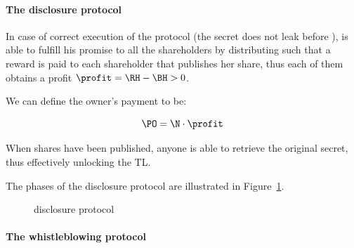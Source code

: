 \paragraph{The disclosure protocol}

In case of correct execution of the protocol (the secret does not leak before \td),  \owner is able to fulfill his promise to all the shareholders by distributing \PO such that a reward \RH is paid to each shareholder that publishes her share, thus each of them obtains a profit $\profit = \RH - \BH > 0$.

We can define the owner's payment to be:

\begin{equation}\label{eqbalance}
\PO = \N \cdot \profit
\end{equation}

When \K shares have been published, anyone is able to retrieve the original secret, thus effectively unlocking the TL.

The phases of the disclosure protocol are illustrated in Figure~\ref{protocol:disclosure}.

\begin{figure}[t]
	\centering
	\caption{\shortname disclosure protocol}
	\label{protocol:disclosure}
\end{figure}

\paragraph{The whistleblowing protocol}

